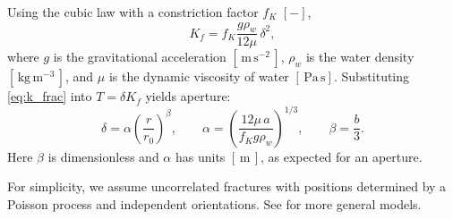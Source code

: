 \begin{enumerate}
Using the cubic law with a constriction factor $f_K$ $[-]$,
\begin{equation}
    \label{eq:k_frac}
    K_f = f_K \frac{g \rho_w}{12\mu}\,\delta^{2},
\end{equation}
where $g$ is the gravitational acceleration $[\,\mathrm{m\,s^{-2}}\,]$,
$\rho_w$ is the water density $[\,\mathrm{kg\,m^{-3}}\,]$, and
$\mu$ is the dynamic viscosity of water $[\,\mathrm{Pa\,s}]$.
Substituting \eqref{eq:k_frac} into $T=\delta K_f$ yields
aperture:
\begin{equation}
    \label{eq:k_frac_1}
    \delta = \alpha \left(\frac{r}{r_0}\right)^{\beta},
    \qquad
    \alpha = \left(\frac{12\mu\,a}{f_K g \rho_w}\right)^{\!1/3},
    \qquad
    \beta = \frac{b}{3}.
\end{equation}
Here $\beta$ is dimensionless and $\alpha$ has units $[\,\mathrm{m}\,]$, as expected for an aperture.


\end{enumerate}

For simplicity, we assume uncorrelated fractures with positions determined by a Poisson process and independent orientations. See 
\cite{Sahimi20110420, Liu2016} for more general models.




